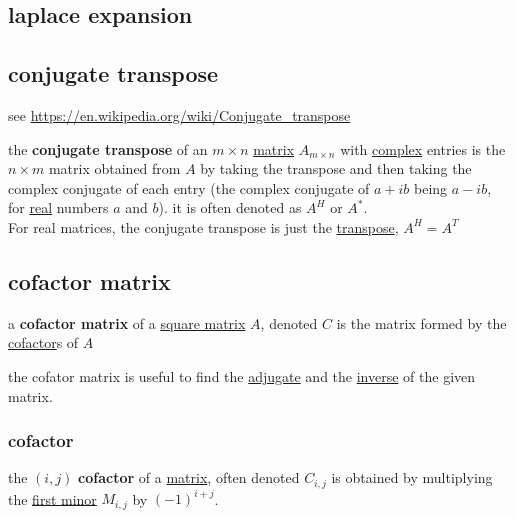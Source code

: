 \documentclass[a4paper,12pt]{article}
\begin{document}
\subsection{laplace expansion}
\label{sec:orgfd4b3c6}
\subsection{conjugate transpose}
\label{sec:orgc578b7e}
see \url{https://en.wikipedia.org/wiki/Conjugate\_transpose}\\
\begin{definition}
the \textbf{conjugate transpose} of an \(m\times n\) \hyperref[sec:org2833a15]{matrix} \(A_{m\times n}\) with \href{calculus2.org}{complex} entries is the \(n\times m\) matrix obtained from \(A\) by taking the transpose and then taking the complex conjugate of each entry (the complex conjugate of \(a+ib\) being \(a-ib\), for \href{calculus2.org}{real} numbers \(a\) and \(b\)). it is often denoted as \(A^H\) or \(A^*\).\\
For real matrices, the conjugate transpose is just the \hyperref[sec:org668c066]{transpose}, \(A^H = A^T\)\\
\end{definition}
\subsection{cofactor matrix}
\label{sec:org47e0d92}
\begin{definition}
a \textbf{cofactor matrix} of a \hyperref[sec:orgf670bc9]{square matrix} \(A\), denoted \(C\) is the matrix formed by the \hyperref[sec:org4ffc1b2]{cofactor}s of \(A\)\\
\begin{characteristic}
the cofator matrix is useful to find the \hyperref[sec:org517aaf6]{adjugate} and the \hyperref[sec:orgb6a6a45]{inverse} of the given matrix.\\
\end{characteristic}
\end{definition}
\subsubsection{cofactor}
\label{sec:org4ffc1b2}
\begin{definition}
the \((i,j)\) \textbf{cofactor} of a \hyperref[sec:org2833a15]{matrix}, often denoted \(C_{i,j}\) is obtained by multiplying the \hyperref[sec:org4a814ef]{first minor} \(M_{i,j}\) by \((-1)^{i+j}\).\\
\end{definition}
\end{document}
